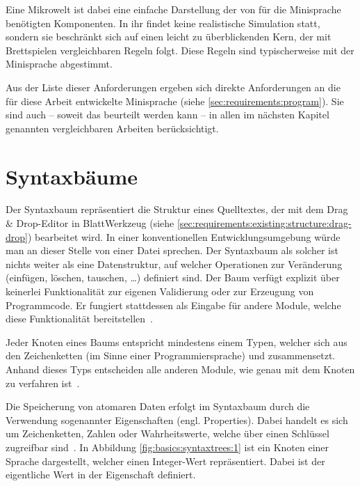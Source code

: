 Eine Mikrowelt ist dabei eine einfache Darstellung der von für die Minisprache benötigten Komponenten. In ihr findet keine realistische Simulation statt, sondern sie beschränkt sich auf einen leicht zu überblickenden Kern, der mit Brettspielen vergleichbaren Regeln folgt. Diese Regeln sind typischerweise mit der Minisprache abgestimmt.

Aus der Liste dieser Anforderungen ergeben sich direkte Anforderungen an die für diese Arbeit entwickelte Minisprache (siehe \ref{sec:requirements:program}). Sie sind auch -- soweit das beurteilt werden kann -- in allen im nächsten Kapitel genannten vergleichbaren Arbeiten berücksichtigt.

\section{Syntaxbäume}
\label{sec:basics:syntaxtrees}

Der Syntaxbaum repräsentiert die Struktur eines Quelltextes, der mit dem Drag \& Drop-Editor in BlattWerkzeug (siehe \ref{sec:requirements:existing:structure:drag-drop}) bearbeitet wird. In einer konventionellen Entwicklungsumgebung würde man an dieser Stelle von einer Datei sprechen. Der Syntaxbaum als solcher ist nichts weiter als eine Datenstruktur, auf welcher Operationen zur Veränderung (einfügen, löschen, tauschen, \dots) definiert sind. Der Baum verfügt explizit über keinerlei Funktionalität zur eigenen Validierung oder zur Erzeugung von Programmcode. Er fungiert stattdessen als Eingabe für andere Module, welche diese Funktionalität bereitstellen~\cite[3]{riemer2018}.

Jeder Knoten eines Baums entspricht mindestens einem Typen, welcher sich aus den Zeichenketten  (im Sinne einer Programmiersprache) und  zusammensetzt. Anhand dieses Typs entscheiden alle anderen Module, wie genau mit dem Knoten zu verfahren ist~\cite[4]{riemer2018}.

Die Speicherung von atomaren Daten erfolgt im Syntaxbaum durch die Verwendung sogenannter Eigenschaften (engl. Properties). Dabei handelt es sich um Zeichenketten, Zahlen oder Wahrheitswerte, welche über einen Schlüssel zugreifbar sind~\cite[4]{riemer2018}. In Abbildung \ref{fig:basics:syntaxtrees:1} ist ein Knoten  einer Sprache  dargestellt, welcher einen Integer-Wert repräsentiert. Dabei ist der eigentliche Wert in der Eigenschaft  definiert.

